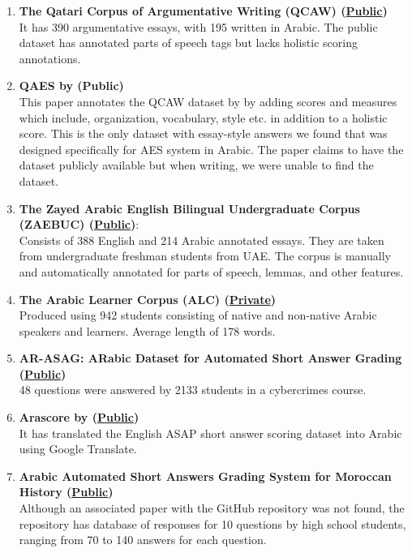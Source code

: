 \documentclass{article}
\begin{document}
	
	\begin{enumerate}
		\item \textbf{The Qatari Corpus of Argumentative Writing (QCAW)  \cite{zaghouani2024qcaw} (\href{https://catalog.ldc.upenn.edu/LDC2022T04}{Public})} \\ It has 390 argumentative essays, with 195 written in Arabic. The public dataset has annotated parts of speech tags but lacks holistic scoring annotations.
		\item \textbf{QAES by \textcite{21_bashendy2024qaes} (Public)} \\ This paper annotates the QCAW dataset by \textcite{zaghouani2024qcaw} by adding scores and measures which include, organization, vocabulary, style etc. in addition to a holistic score. This is the only dataset with essay-style answers we found that was designed specifically for AES system in Arabic. The paper claims to have the dataset publicly available but when writing, we were unable to find the dataset.
		\item \textbf{The Zayed Arabic English Bilingual Undergraduate Corpus (ZAEBUC) \cite{habash2022zaebuc} (\href{https://sites.google.com/view/zaebuc/home} {Public})}:  \\ 
		Consists of 388 English and 214 Arabic annotated essays. They are taken from undergraduate freshman students from UAE. The corpus is manually and automatically annotated for parts of speech, lemmas, and other features.
		\item \textbf{The Arabic Learner Corpus (ALC) (\href{https://www.arabiclearnercorpus.com/}{Private})} \\ Produced using 942 students consisting of native and non-native Arabic speakers and learners. Average length of 178 words.
		\item \textbf{AR-ASAG: ARabic Dataset for Automated Short Answer Grading \cite{ouahrani2020ar-asag} (\href{https://github.com/leilaouahrani/AR-ASAG-Dataset}{Public})} \\ 48 questions were answered by 2133 students in a cybercrimes course.
		\item \textbf{Arascore by \textcite{nael2022arascore} (\href{https://github.com/abdelrahmanelnaka/AraScore-Dataset}{Public})} \\ It has translated the English ASAP short answer scoring dataset into Arabic using Google Translate.
		\item \textbf{Arabic Automated Short Answers Grading System for Moroccan History (\href{https://github.com/ahmed-bentajhamyani/grading-system}{Public})} \\ Although an associated paper with the GitHub repository was not found, the repository has database of responses for 10 questions by high school students, ranging from 70 to 140 answers for each question.
	\end{enumerate}
	
\end{document}
